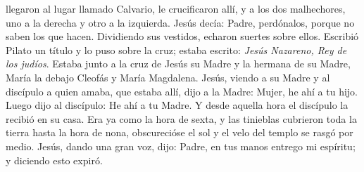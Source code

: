 llegaron al lugar llamado Calvario, le crucificaron allí, y a los dos malhechores, uno a la derecha y otro a la izquierda. 
Jesús decía: Padre, perdónalos, porque no saben los que hacen. Dividiendo sus vestidos, echaron suertes sobre ellos. Escribió Pilato un título y lo puso sobre la cruz;
estaba escrito: \textit{Jesús Nazareno, Rey de los judíos}. Estaba junto a la cruz de Jesús su Madre y la hermana de su Madre, María la debajo Cleofás y María Magdalena.
Jesús, viendo a su Madre y al discípulo a quien amaba, que estaba allí, dijo a la Madre: Mujer, he ahí a tu hijo. Luego dijo al discípulo: He ahí a tu Madre.
Y desde aquella hora el discípulo la recibió en su casa. Era ya como la hora de sexta, y las tinieblas cubrieron toda la tierra hasta la hora de nona,
obscurecióse el sol y el velo del templo se rasgó por medio. Jesús, dando una gran voz, dijo: Padre, en tus manos entrego mi espíritu; y diciendo esto expiró.

